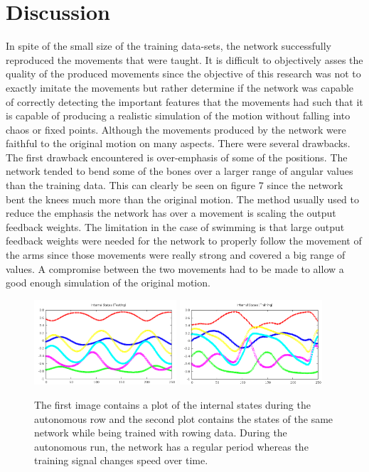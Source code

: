 \documentclass[letterpaper,9pt]{article}
\begin{document}
\section{Discussion}

In spite of the small size of the training data-sets, the network successfully reproduced the movements that were taught. It is difficult to objectively asses the quality of the produced movements since the objective of this research was not to exactly imitate the movements but rather determine if the network was capable of correctly detecting the important features that the movements had such that it is capable of producing a realistic simulation of the motion without falling into chaos or fixed points. Although the movements produced by the network were faithful to the original motion on many aspects. There were several drawbacks.\\

The first drawback encountered is over-emphasis of some of the positions. The network tended to bend some of the bones over a larger range of angular values than the training data. This can clearly be seen on figure 7 since the network bent the knees much more than the original motion. The method usually used to reduce the emphasis the network has over a movement is scaling the output feedback weights. The limitation in the case of swimming is that large output feedback weights were needed for the network to properly follow the movement of the arms since those movements were really strong and covered a big range of values. A compromise between the two movements had to be made to allow a good enough simulation of the original motion. \pagebreak

\begin{figure}[h!]
  \centering
  \includegraphics[width=200px]{Extra/out_states_rowing.png}
  \includegraphics[width=200px]{Extra/train_states_rowing.png}
  \caption[Internal States Evolution]{The first image contains a plot of the internal states during the autonomous row and the second plot contains the states of the same network while being trained with rowing data. During the autonomous run, the network has a regular period whereas the training signal changes speed over time.}
\end{figure}
\end{document}
